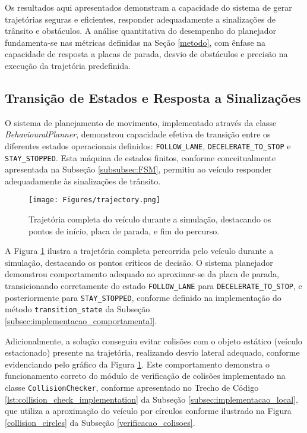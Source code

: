 Os resultados aqui apresentados demonstram a capacidade do sistema de gerar trajetórias seguras e eficientes, responder adequadamente a sinalizações de trânsito e obstáculos. A análise quantitativa do desempenho do planejador fundamenta-se nas métricas definidas na Seção \ref{metodo}, com ênfase na capacidade de resposta a placas de parada, desvio de obstáculos e precisão na execução da trajetória predefinida.

\subsection{Transição de Estados e Resposta a Sinalizações} \label{subsec:transicao_estados}

O sistema de planejamento de movimento, implementado através da classe \textit{BehaviouralPlanner}, demonstrou capacidade efetiva de transição entre os diferentes estados operacionais definidos: \texttt{FOLLOW\_LANE}, \texttt{DECELERATE\_TO\_STOP} e \texttt{STAY\_STOPPED}. Esta máquina de estados finitos, conforme conceitualmente apresentada na Subseção \ref{subsubsec:FSM}, permitiu ao veículo responder adequadamente às sinalizações de trânsito.

\begin{figure}[H]
\centering
\texttt{[image: Figures/trajectory.png]}
\caption{Trajetória completa do veículo durante a simulação, destacando os pontos de início, placa de parada, e fim do percurso.}
\label{fig:trajetoria}
\end{figure}

A Figura \ref{fig:trajetoria} ilustra a trajetória completa percorrida pelo veículo durante a simulação, destacando os pontos críticos de decisão. O sistema planejador demonstrou comportamento adequado ao aproximar-se da placa de parada, transicionando corretamente do estado \texttt{FOLLOW\_LANE} para \texttt{DECELERATE\_TO\_STOP}, e posteriormente para \texttt{STAY\_STOPPED}, conforme definido na implementação do método \texttt{transition\_state} da Subseção \ref{subsec:implementacao_comportamental}. 

Adicionalmente, a solução conseguiu evitar colisões com o objeto estático (veículo estacionado) presente na trajetória, realizando desvio lateral adequado, conforme evidenciando pelo gráfico da Figura \ref{fig:trajetoria}. Este comportamento demonstra o funcionamento correto do módulo de verificação de colisões implementado na classe \texttt{CollisionChecker}, conforme apresentado no Trecho de Código \ref{lst:collision_check_implementation} da Subseção \ref{subsec:implementacao_local}, que utiliza a aproximação do veículo por círculos conforme ilustrado na Figura \ref{collision_circles} da Subseção \ref{verificacao_colisoes}.

